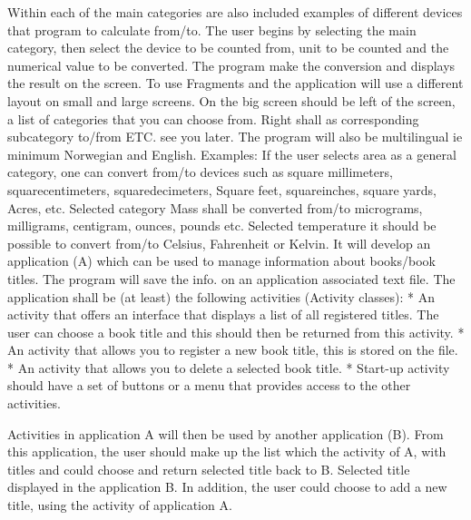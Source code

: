 Within each of the main categories are also included examples of different devices that program to calculate from/to. 
The user begins by selecting the main category, then select the device to be counted from, unit to be counted and the numerical value to be converted. 
The program make the conversion and displays the result on the screen.
To use Fragments and the application will use a different layout on small and large screens. 
On the big screen should be left of the screen, a list of categories that you can choose from. 
Right shall as corresponding subcategory to/from ETC. see you later. The program will also be multilingual ie minimum Norwegian and English.
Examples: 
If the user selects area as a general category, one can convert from/to devices such as square millimeters, squarecentimeters, squaredecimeters, Square feet, 
squareinches, square yards, Acres, etc. 
Selected category Mass shall be converted from/to micrograms, milligrams, centigram, ounces, pounds etc. 
Selected temperature it should be possible to convert from/to Celsius, Fahrenheit or Kelvin.
\vspace{0.5em}\newline
It will develop an application (A) which can be used to manage information about books/book titles. 
The program will save the info. on an application associated text file. 
The application shall be (at least) the following activities (Activity classes):
* An activity that offers an interface that displays a list of all registered titles. 
The user can choose a book title and this should then be returned from this activity.
* An activity that allows you to register a new book title, this is stored on the file.
* An activity that allows you to delete a selected book title.
* Start-up activity should have a set of buttons or a menu that provides access to the other activities.

Activities in application A will then be used by another application (B). 
From this application, the user should make up the list which the activity of A, with titles and could choose and return selected title back to B. 
Selected title displayed in the application B. In addition, the user could choose to add a new title, using the activity of application A.

